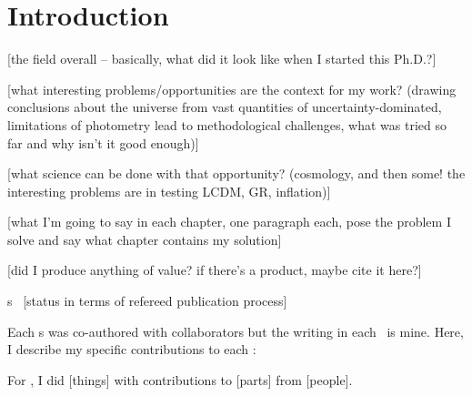 \chapter*{Introduction}

[the field overall -- basically, what did it look like when I started this Ph.D.?]

[what interesting problems/opportunities are the context for my work?  (drawing conclusions about the universe from vast quantities of uncertainty-dominated, limitations of photometry lead to methodological challenges, what was tried so far and why isn't it good enough)]

[what science can be done with that opportunity? (cosmology, and then some! the interesting problems are in testing LCDM, GR, inflation)]

[what I'm going to say in each chapter, one paragraph each, pose the problem I solve and say what chapter contains my solution]

[did I produce anything of value? if there's a product, maybe cite it here?]

\chapname s~ [status in terms of refereed publication process]

Each \chapname s was co-authored with collaborators but the writing in each \chapname\ is mine.
Here, I describe my specific contributions to each \chapname:
\begin{enumerate}

{\item For , I did [things] with contributions to [parts] from [people].}

\end{enumerate}
